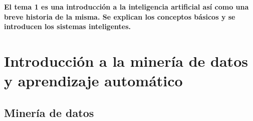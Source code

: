 \textbf{El tema 1 es una introducción a la inteligencia artificial así como una breve historia de la misma. 
Se explican los conceptos básicos y se introducen los sistemas inteligentes.}

\section{Introducción a la minería de datos y aprendizaje automático}

\subsection{Minería de datos}


\newpage
